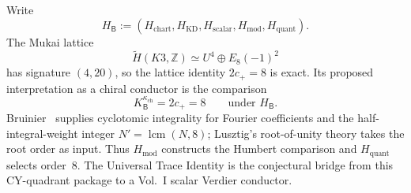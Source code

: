 Write
\[
H_{\mathsf B}:=(H_{\mathrm{chart}},H_{\mathrm{KD}},H_{\mathrm{scalar}},
H_{\mathrm{mod}},H_{\mathrm{quant}}).
\]
The Mukai lattice
\[
\widetilde H(K3,\mathbb Z)
\simeq U^4\oplus E_8(-1)^2
\]
has signature $(4,20)$, so the lattice identity $2c_+=8$ is exact.
Its proposed interpretation as a chiral conductor is the
\ClaimStatusConjectured{} comparison
\[
K^{\kappa_{\mathrm{ch}}}_{\mathsf B}=2c_+=8
\qquad\text{under }H_{\mathsf B}.
\]
Bruinier~\cite[Lemma~5.1]{Bruinier2002} supplies cyclotomic
integrality for Fourier coefficients and the half-integral-weight
integer $N'=\operatorname{lcm}(N,8)$; Lusztig's root-of-unity theory
takes the root order as input.  Thus $H_{\mathrm{mod}}$ constructs the
Humbert comparison and $H_{\mathrm{quant}}$ selects order~$8$.
The Universal Trace Identity is the conjectural bridge from this
CY-quadrant package to a Vol.~I scalar Verdier conductor.
